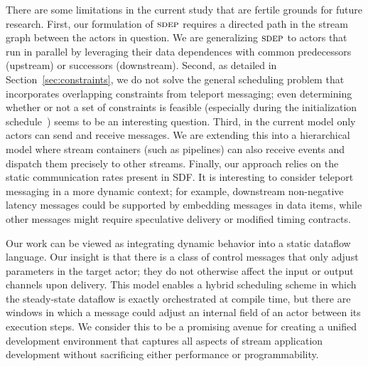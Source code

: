 There are some limitations in the current study that are fertile
grounds for future research.  First, our formulation of $\textsc{sdep}$
requires a directed path in the stream graph between the actors in
question.  We are generalizing $\textsc{sdep}$ to actors that run in parallel
by leveraging their data dependences with common predecessors
(upstream) or successors (downstream).  Second, as detailed in
Section~\ref{sec:constraints}, we do not solve the general scheduling
problem that incorporates overlapping constraints from teleport
messaging; even determining whether or not a set of constraints is
feasible (especially during the initialization
schedule~\cite{karczma-thesis}) seems to be an interesting question.
Third, in the current model only actors can send and receive messages.
We are extending this into a hierarchical model where stream
containers (such as pipelines) can also receive events and dispatch
them precisely to other streams.  Finally, our approach relies on the
static communication rates present in SDF.  It is interesting to
consider teleport messaging in a more dynamic context; for example,
downstream non-negative latency messages could be supported by
embedding messages in data items, while other messages might require
speculative delivery or modified timing contracts.

Our work can be viewed as integrating dynamic behavior into a static
dataflow language.  Our insight is that there is a class of control
messages that only adjust parameters in the target actor; they do not
otherwise affect the input or output channels upon delivery.  This
model enables a hybrid scheduling scheme in which the steady-state
dataflow is exactly orchestrated at compile time, but there are
windows in which a message could adjust an internal field of an actor
between its execution steps.  We consider this to be a promising
avenue for creating a unified development environment that captures
all aspects of stream application development without sacrificing
either performance or programmability.\vspace{-2pt}
